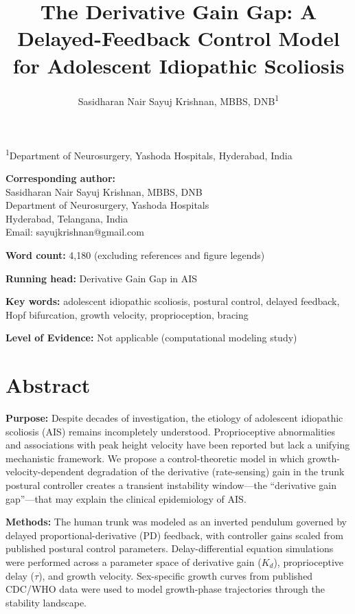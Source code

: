 \documentclass[12pt,a4paper]{article}
\title{\textbf{The Derivative Gain Gap: A Delayed-Feedback Control Model\\for Adolescent Idiopathic Scoliosis}}
\author{
  Sasidharan Nair Sayuj Krishnan, MBBS, DNB\textsuperscript{1}
}
\date{}
\begin{document}
\maketitle

\noindent\textsuperscript{1}Department of Neurosurgery, Yashoda Hospitals, Hyderabad, India

\bigskip
\noindent\textbf{Corresponding author:}\\
Sasidharan Nair Sayuj Krishnan, MBBS, DNB\\
Department of Neurosurgery, Yashoda Hospitals\\
Hyderabad, Telangana, India\\
Email: sayujkrishnan@gmail.com

\bigskip
\noindent\textbf{Word count:} 4,180 (excluding references and figure legends)

\bigskip
\noindent\textbf{Running head:} Derivative Gain Gap in AIS

\bigskip
\noindent\textbf{Key words:} adolescent idiopathic scoliosis, postural control, delayed feedback, Hopf bifurcation, growth velocity, proprioception, bracing

\bigskip
\noindent\textbf{Level of Evidence:} Not applicable (computational modeling study)

\newpage

\section*{Abstract}

\noindent\textbf{Purpose:}
Despite decades of investigation, the etiology of adolescent idiopathic scoliosis (AIS) remains incompletely understood. Proprioceptive abnormalities and associations with peak height velocity have been reported but lack a unifying mechanistic framework. We propose a control-theoretic model in which growth-velocity-dependent degradation of the derivative (rate-sensing) gain in the trunk postural controller creates a transient instability window---the ``derivative gain gap''---that may explain the clinical epidemiology of AIS.

\noindent\textbf{Methods:}
The human trunk was modeled as an inverted pendulum governed by delayed proportional-derivative (PD) feedback, with controller gains scaled from published postural control parameters. Delay-differential equation simulations were performed across a parameter space of derivative gain ($K_d$), proprioceptive delay ($\tau$), and growth velocity. Sex-specific growth curves from published CDC/WHO data were used to model growth-phase trajectories through the stability landscape.
\end{document}
